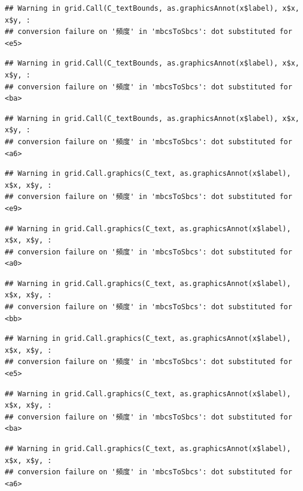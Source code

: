 \documentclass[
]{book}
\begin{document}
\begin{verbatim}
## Warning in grid.Call(C_textBounds, as.graphicsAnnot(x$label), x$x, x$y, :
## conversion failure on '頻度' in 'mbcsToSbcs': dot substituted for <e5>
\end{verbatim}

\begin{verbatim}
## Warning in grid.Call(C_textBounds, as.graphicsAnnot(x$label), x$x, x$y, :
## conversion failure on '頻度' in 'mbcsToSbcs': dot substituted for <ba>
\end{verbatim}

\begin{verbatim}
## Warning in grid.Call(C_textBounds, as.graphicsAnnot(x$label), x$x, x$y, :
## conversion failure on '頻度' in 'mbcsToSbcs': dot substituted for <a6>
\end{verbatim}

\begin{verbatim}
## Warning in grid.Call.graphics(C_text, as.graphicsAnnot(x$label), x$x, x$y, :
## conversion failure on '頻度' in 'mbcsToSbcs': dot substituted for <e9>
\end{verbatim}

\begin{verbatim}
## Warning in grid.Call.graphics(C_text, as.graphicsAnnot(x$label), x$x, x$y, :
## conversion failure on '頻度' in 'mbcsToSbcs': dot substituted for <a0>
\end{verbatim}

\begin{verbatim}
## Warning in grid.Call.graphics(C_text, as.graphicsAnnot(x$label), x$x, x$y, :
## conversion failure on '頻度' in 'mbcsToSbcs': dot substituted for <bb>
\end{verbatim}

\begin{verbatim}
## Warning in grid.Call.graphics(C_text, as.graphicsAnnot(x$label), x$x, x$y, :
## conversion failure on '頻度' in 'mbcsToSbcs': dot substituted for <e5>
\end{verbatim}

\begin{verbatim}
## Warning in grid.Call.graphics(C_text, as.graphicsAnnot(x$label), x$x, x$y, :
## conversion failure on '頻度' in 'mbcsToSbcs': dot substituted for <ba>
\end{verbatim}

\begin{verbatim}
## Warning in grid.Call.graphics(C_text, as.graphicsAnnot(x$label), x$x, x$y, :
## conversion failure on '頻度' in 'mbcsToSbcs': dot substituted for <a6>
\end{verbatim}
\end{document}
